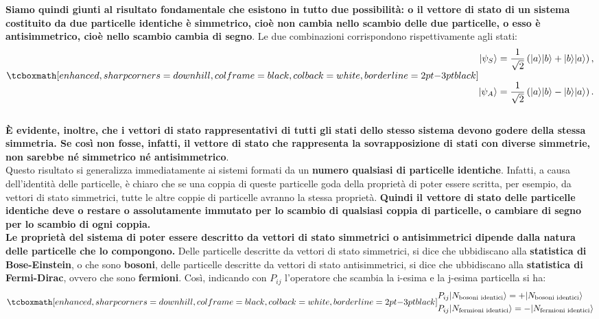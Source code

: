 \textbf{Siamo quindi giunti al risultato fondamentale che esistono in tutto due possibilità: o il vettore di stato di un sistema costituito da due particelle identiche è simmetrico, cioè non cambia nello scambio delle due particelle, o esso è antisimmetrico, cioè nello scambio cambia di segno}. Le due combinazioni corrispondono rispettivamente agli stati:
	\begin{equation}
	\label{eq:cap20_4}
		\tcboxmath[enhanced, sharp corners=downhill, colframe=black, colback=white, borderline={2pt}{-3pt}{black}]{
		\begin{aligned}
			|\psi _S\rangle= \frac{1}{\sqrt{2}}\left(|a\rangle |b\rangle + |b\rangle|a\rangle \right) , \\[0.3cm]
			|\psi _A\rangle= \frac{1}{\sqrt{2}}\left(|a\rangle |b\rangle - |b\rangle|a\rangle \right). 
		\end{aligned}		
		}
	\end{equation}\\
	
\textbf{È evidente, inoltre, che i vettori di stato rappresentativi di tutti gli stati dello stesso sistema devono godere della stessa simmetria. Se così non fosse, infatti, il vettore di stato che rappresenta la sovrapposizione di stati con diverse simmetrie, non sarebbe né simmetrico né antisimmetrico}.\\

Questo risultato si generalizza immediatamente ai sistemi formati da un \textbf{numero qualsiasi di particelle identiche}. Infatti, a causa dell'identità delle particelle, è chiaro che se una coppia di queste particelle goda della proprietà di poter essere scritta, per esempio, da vettori di stato simmetrici, tutte le altre coppie di particelle avranno la stessa proprietà. \textbf{Quindi il vettore di stato delle particelle identiche deve o restare o assolutamente immutato per lo scambio di qualsiasi coppia di particelle, o cambiare di segno per lo scambio di ogni coppia.}\\

\textbf{Le proprietà del sistema di poter essere descritto da vettori di stato simmetrici o antisimmetrici dipende dalla natura delle particelle che lo compongono.} Delle particelle descritte da vettori di stato simmetrici, si dice che ubbidiscano alla \textbf{statistica di Bose-Einstein}, o che sono \textbf{bosoni}, delle particelle descritte da vettori di stato antisimmetrici, si dice che ubbidiscano alla \textbf{statistica di Fermi-Dirac}, ovvero che sono \textbf{fermioni}. Così, indicando con $P_{ij}$ l'operatore che scambia la i-esima e la j-esima particella si ha:
	\begin{equation}
		\tcboxmath[enhanced, sharp corners=downhill, colframe=black, colback=white, borderline={2pt}{-3pt}{black}]{
		\begin{aligned}
			&P_{ij} |N_{\textrm{bosoni identici}}\rangle= +|N_{\textrm{bosoni identici}}\rangle  \\
			&P_{ij} |N_{\textrm{fermioni identici}}\rangle= -|N_{\textrm{fermioni identici}}\rangle 
		\end{aligned}
		}
	\end{equation}\\
	
